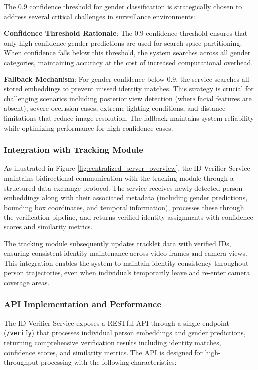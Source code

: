 The $0.9$ confidence threshold for gender classification is strategically chosen to address several critical challenges in surveillance environments:

\textbf{Confidence Threshold Rationale}: The $0.9$ confidence threshold ensures that only high-confidence gender predictions are used for search space partitioning. When confidence falls below this threshold, the system searches across all gender categories, maintaining accuracy at the cost of increased computational overhead.

\textbf{Fallback Mechanism}: For gender confidence below $0.9$, the service searches all stored embeddings to prevent missed identity matches. This strategy is crucial for challenging scenarios including posterior view detection (where facial features are absent), severe occlusion cases, extreme lighting conditions, and distance limitations that reduce image resolution. The fallback maintains system reliability while optimizing performance for high-confidence cases.

\subsubsection{Integration with Tracking Module}

As illustrated in Figure \ref{fig:centralized_server_overview}, the ID Verifier Service maintains bidirectional communication with the tracking module through a structured data exchange protocol. The service receives newly detected person embeddings along with their associated metadata (including gender predictions, bounding box coordinates, and temporal information), processes these through the verification pipeline, and returns verified identity assignments with confidence scores and similarity metrics.

The tracking module subsequently updates tracklet data with verified IDs, ensuring consistent identity maintenance across video frames and camera views. This integration enables the system to maintain identity consistency throughout person trajectories, even when individuals temporarily leave and re-enter camera coverage areas.

\subsubsection{API Implementation and Performance}

The ID Verifier Service exposes a RESTful API through a single endpoint (\texttt{/verify}) that processes individual person embeddings and gender predictions, returning comprehensive verification results including identity matches, confidence scores, and similarity metrics. The API is designed for high-throughput processing with the following characteristics:

